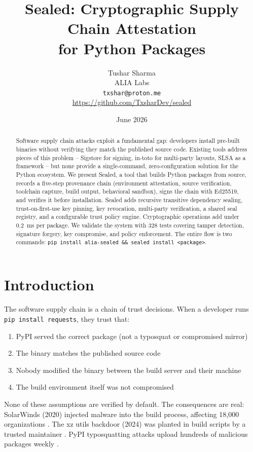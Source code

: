 \documentclass[11pt,a4paper]{article}
\title{\textbf{Sealed: Cryptographic Supply Chain Attestation\\for Python Packages}}
\author{
  Tushar Sharma \\
  ALIA Labs \\
  \texttt{txshar@proton.me} \\
  \url{https://github.com/TxsharDev/sealed}
}
\date{June 2026}
\begin{document}
\maketitle
\thispagestyle{fancy}

\begin{abstract}
Software supply chain attacks exploit a fundamental gap: developers install pre-built binaries without verifying they match the published source code. Existing tools address pieces of this problem -- Sigstore for signing, in-toto for multi-party layouts, SLSA as a framework -- but none provide a single-command, zero-configuration solution for the Python ecosystem. We present Sealed, a tool that builds Python packages from source, records a five-step provenance chain (environment attestation, source verification, toolchain capture, build output, behavioral sandbox), signs the chain with Ed25519, and verifies it before installation. Sealed adds recursive transitive dependency sealing, trust-on-first-use key pinning, key revocation, multi-party verification, a shared seal registry, and a configurable trust policy engine. Cryptographic operations add under 0.2~ms per package. We validate the system with 328 tests covering tamper detection, signature forgery, key compromise, and policy enforcement. The entire flow is two commands: \texttt{pip install alia-sealed \&\& sealed install <package>}.
\end{abstract}

\section{Introduction}

The software supply chain is a chain of trust decisions. When a developer runs \texttt{pip install requests}, they trust that:

\begin{enumerate}
  \item PyPI served the correct package (not a typosquat or compromised mirror)
  \item The binary matches the published source code
  \item Nobody modified the binary between the build server and their machine
  \item The build environment itself was not compromised
\end{enumerate}

None of these assumptions are verified by default. The consequences are real: SolarWinds (2020) injected malware into the build process, affecting 18,000 organizations \cite{solarwinds}. The xz utils backdoor (2024) was planted in build scripts by a trusted maintainer \cite{xz}. PyPI typosquatting attacks upload hundreds of malicious packages weekly \cite{typosquat}.
\end{document}

